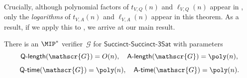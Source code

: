 \documentclass[11pt]{article}
\newcommand{\succinctsquared}{\mathsf{Succinct}\text{-}\mathsf{Succinct}\text{-}\mathsf{3Sat}}
\newcommand{\game}{\mathscr{G}}
\newcommand{\qtime}[1]{\mathsf{Q}\textnormal{-}\mathsf{time}(#1)}
\newcommand{\atime}[1]{\mathsf{A}\textnormal{-}\mathsf{time}(#1)}
\newcommand{\qlength}[1]{\mathsf{Q}\textnormal{-}\mathsf{length}(#1)}
\newcommand{\alength}[1]{\mathsf{A}\textnormal{-}\mathsf{length}(#1)}
\begin{document}
Crucially, although polynomial factors of $t_{V,Q}(n)$ and $\ell_{V, Q}(n)$ appear in ,
only the \emph{logarithms} of $t_{V,A}(n)$ and $\ell_{V, A}(n)$ appear in this theorem.
As a result, if we apply this to , we arrive at our main result.

\begin{theorem}
  \label{thm:main}
There is an $\MIP^*$ verifier~$\game$ for $\succinctsquared$ with parameters
\begin{equation*}
\qlength{\game} =O(n), \quad
\alength{\game} = \poly(n),
\end{equation*}
\begin{equation*}
\qtime{\game} = \poly(n), \quad
\atime{\game} = \poly(n).
\end{equation*}
\end{theorem}









\end{document}
